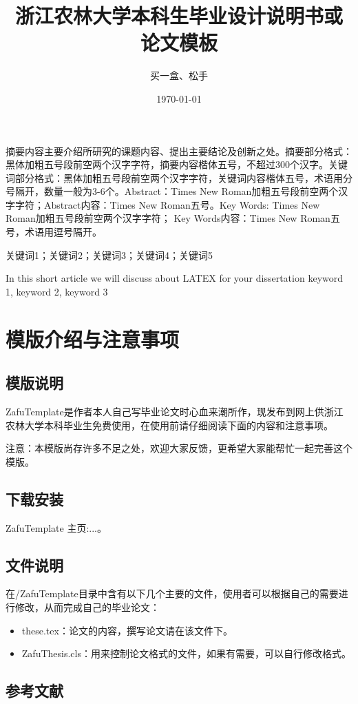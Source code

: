 \documentclass[AutoFakeBold]{ZafuThesis}
\author{买一盒、松手}%
\date{\today}%
\title{{浙江农林大学本科生}{毕业设计说明书或论文模板}}%
\begin{document}
\customCover

\makestatement

\customContent

\frontmatter
\ZhAbstract
{
  摘要内容主要介绍所研究的课题内容、提出主要结论及创新之处。摘要部分格式：黑体加粗五号段前空两个汉字字符，摘要内容楷体五号，不超过300个汉字。关键词部分格式：黑体加粗五号段前空两个汉字字符，关键词内容楷体五号，术语用分号隔开，数量一般为3-6个。Abstract：Times New Roman加粗五号段前空两个汉字字符；Abstract内容：Times New Roman五号。Key Words: Times New Roman加粗五号段前空两个汉字字符； Key Words内容：Times New Roman五号，术语用逗号隔开。
  
}
{关键词1；关键词2；关键词3；关键词4；关键词5}


\EnAbstract
{In this short article we will discuss about LATEX for your dissertation}
{keyword 1, keyword 2, keyword 3}


\mainmatter
\section{模版介绍与注意事项}
\subsection{模版说明}
ZafuTemplate是作者本人自己写毕业论文时心血来潮所作，现发布到网上供浙江农林大学本科毕业生免费使用，在使用前请仔细阅读下面的内容和注意事项。\par
注意：本模版尚存许多不足之处，欢迎大家反馈，更希望大家能帮忙一起完善这个模版。
\subsection{下载安装}
ZafuTemplate 主页:...。
\subsection{文件说明}
在/ZafuTemplate目录中含有以下几个主要的文件，使用者可以根据自己的需要进行修改，从而完成自己的毕业论文：
\begin{itemize}
  \item these.tex：论文的内容，撰写论文请在该文件下。
  \item ZafuThesis.cls：用来控制论文格式的文件，如果有需要，可以自行修改格式。
\end{itemize}

\subsection{参考文献}
\end{document}
